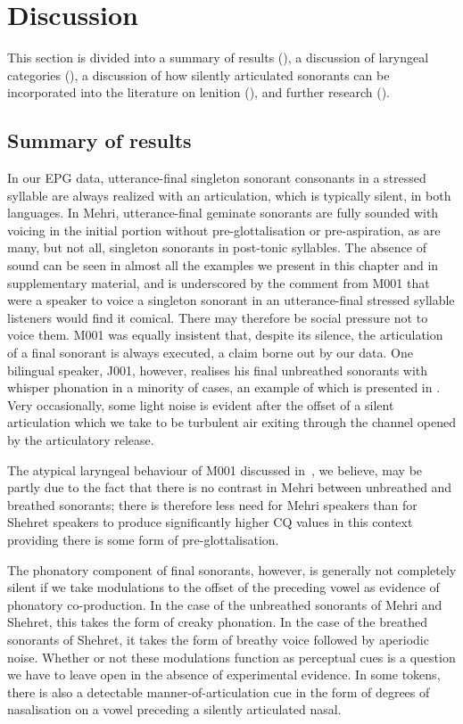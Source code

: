 \documentclass[output=paper]{langscibook}
\begin{document}
\section{Discussion} %
\label{sec:watson:5}
\largerpage
This section is divided into a summary of results (), a discussion of laryngeal categories (), a discussion of how silently articulated sonorants can be incorporated into the literature on lenition (), and further research ().

\subsection{Summary of results} %
\label{sec:watson:5.1}
In our EPG data, utterance-final singleton sonorant consonants in a stressed syllable are always realized with an articulation, which is typically silent, in both languages. In Mehri, utterance-final geminate sonorants are fully sounded with voicing in the initial portion without pre-glottalisation or pre-aspiration, as are many, but not all, singleton sonorants in post-tonic syllables. The absence of sound can be seen in almost all the examples we present in this chapter and in supplementary material, and is underscored by the comment from M001 that were a speaker to voice a singleton sonorant in an utterance-final stressed syllable listeners would find it comical. There may therefore be social pressure not to voice them. M001 was equally insistent that, despite its silence, the articulation of a final sonorant is always executed, a claim borne out by our data. One bilingual speaker, J001, however, realises his final unbreathed sonorants with whisper phonation in a minority of cases, an example of which is presented in . Very occasionally, some light noise is evident after the offset of a silent articulation which we take to be turbulent air exiting through the channel opened by the articulatory release.

The atypical laryngeal behaviour of M001 discussed in~, we believe, may be partly due to the fact that there is no contrast in Mehri between unbreathed and breathed sonorants; there is therefore less need for Mehri speakers than for Shehret speakers to produce significantly higher CQ values in this context providing there is some form of pre-glottalisation.

The phonatory component of final sonorants, however, is generally not completely silent if we take modulations to the offset of the preceding vowel as evidence of phonatory co-production. In the case of the unbreathed sonorants of Mehri and Shehret, this takes the form of creaky phonation. In the case of the breathed sonorants of Shehret, it takes the form of breathy voice followed by aperiodic noise. Whether or not these modulations function as perceptual cues is a question we have to leave open in the absence of experimental evidence. In some tokens, there is also a detectable manner-of-articulation cue in the form of degrees of nasalisation on a vowel preceding a silently articulated nasal.
\end{document}
